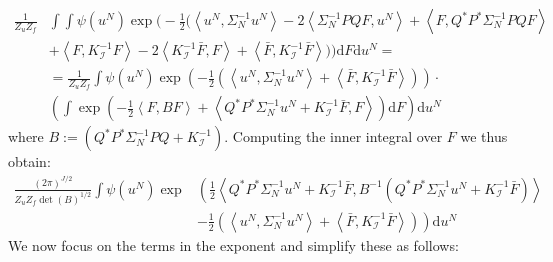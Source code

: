 \begin{align}
    \frac{1}{Z_{u}Z_{f}}&\int\int\psi(u^{N})\exp\Bigg(-\frac{1}{2}\Big(\left\langle u^{N},\Sigma_{N}^{-1}u^{N} \right\rangle - 2\left\langle \Sigma_{N}^{-1}PQF,u^{N}\right\rangle + \left\langle F,Q^{*}P^{*}\Sigma_{N}^{-1}PQF\right\rangle \nonumber \\
    &+ \left\langle F,K_{\mathcal{I}}^{-1}F\right\rangle - 2 \left\langle K_{\mathcal{I}}^{-1}\bar{F},F \right\rangle + \left\langle \bar{F},K_{\mathcal{I}}^{-1}\bar{F}\right\rangle \Big)\Bigg)\mathrm{d}F\mathrm{d}u^{N} = \nonumber \\
    &=\frac{1}{Z_{u}Z_{f}}\int\psi(u^{N})\exp\left(-\frac{1}{2}\left(\left\langle u^{N},\Sigma_{N}^{-1} u^{N} \right\rangle + \left\langle \bar{F},K_{\mathcal{I}}^{-1}\bar{F} \right\rangle\right)\right) \cdot \nonumber \\
    &\left(\int\exp\left(-\frac{1}{2}\left\langle F,BF \right\rangle + \left\langle Q^{*}P^{*}\Sigma_{N}^{-1}u^{N} + K_{\mathcal{I}}^{-1}\bar{F},F \right\rangle\right)\mathrm{d}F\right)\mathrm{d}u^{N}
\end{align}
where $B:=\left(Q^{*}P^{*}\Sigma_{N}^{-1}PQ+K_{\mathcal{I}}^{-1}\right)$. Computing the inner integral over $F$ we thus obtain:
\begin{align}
    \frac{(2\pi)^{J/2}}{Z_{u}Z_{f}\det(B)^{1/2}}\int\psi(u^{N})\exp&\left(\frac{1}{2}\left\langle Q^{*}P^{*}\Sigma_{N}^{-1}u^{N} + K_{\mathcal{I}}^{-1}\bar{F}, B^{-1}\left(Q^{*}P^{*}\Sigma_{N}^{-1}u^{N} + K_{\mathcal{I}}^{-1}\bar{F}\right) \right\rangle\right. \nonumber \\
    &\left.-\frac{1}{2}\left(\left\langle u^{N}, \Sigma_{N}^{-1}u^{N}\right\rangle + \left\langle \bar{F},K_{\mathcal{I}}^{-1}\bar{F} \right\rangle \right)\right)\mathrm{d}u^{N}
\end{align}
We now focus on the terms in the exponent and simplify these as follows:
